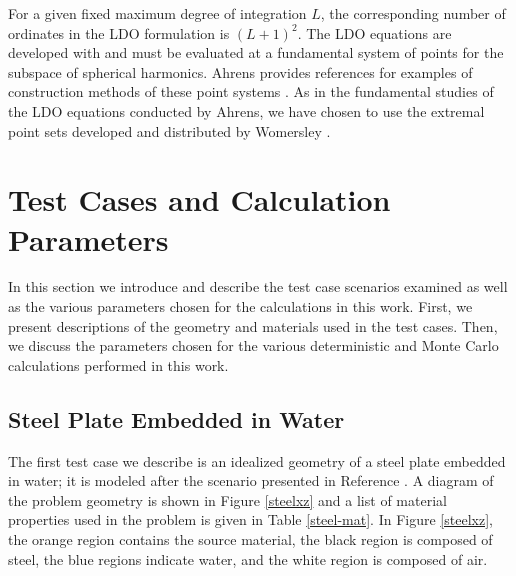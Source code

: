 \documentclass{article} %
\begin{document}
For a given fixed maximum degree of integration $L$, the corresponding number
of ordinates in the LDO formulation is $(L+1)^2$. The LDO equations are
developed with and must be evaluated at a fundamental system of points for the
subspace of spherical harmonics. Ahrens provides references for examples of
construction methods of these point systems \cite{ahrens}. As in the 
fundamental studies of the LDO equations conducted by Ahrens, we
have chosen to use the extremal point sets developed and distributed by
Womersley \cite{wom}.

\section{Test Cases and Calculation Parameters}

In this section we introduce and describe the test case scenarios examined as
well as the various parameters chosen for the calculations in this work. First,
we present descriptions of the geometry and materials used in the test cases.
Then, we discuss the parameters chosen for the various deterministic and Monte
Carlo calculations performed in this work.

\subsection{Steel Plate Embedded in Water}
\label{sec:steel_params}

The first test case we describe is an idealized geometry of a steel plate 
embedded in water; it is modeled after the scenario presented in Reference 
\cite{wilsonslaybaugh}. 
A diagram of the problem geometry is shown in Figure \ref{steelxz} and a list
of material properties used in the problem is given in Table \ref{steel-mat}.
In Figure \ref{steelxz}, the orange region contains the source material, the 
black region is composed of steel, the blue regions indicate water, and the 
white region is composed of air.
\end{document}
